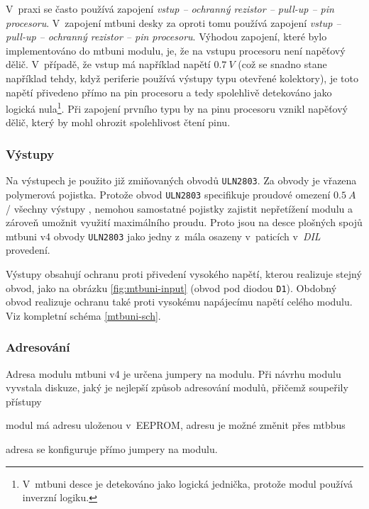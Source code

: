 V~praxi se často používá zapojení \textit{vstup – ochranný rezistor – pull-up –
pin procesoru}. V~zapojení \gls{mtbuni} desky za oproti tomu používá zapojení
\textit{vstup – pull-up – ochranný rezistor – pin procesoru}. Výhodou zapojení,
které bylo implementováno do \gls{mtbuni} modulu, je, že na vstupu procesoru
není napěťový dělič. V~případě, že vstup má například napětí $0.7~V$ (což se
snadno stane například tehdy, když periferie používá výstupy typu otevřené
kolektory), je toto napětí přivedeno přímo na pin procesoru a tedy spolehlivě
detekováno jako logická nula\footnote{V~\gls{mtbuni} desce je detekováno
jako logická jednička, protože modul používá inverzní logiku.}. Při zapojení
prvního typu by na pinu procesoru vznikl napěťový dělič, který by mohl ohrozit
spolehlivost čtení pinu.

\subsubsection{Výstupy}

Na výstupech je použito již zmiňovaných obvodů \texttt{ULN2803}. Za obvody
je vřazena polymerová pojistka. Protože obvod \texttt{ULN2803} specifikuje
proudové omezení $0.5~A$ / všechny výstupy \cite{uln2803-datasheet}, nemohou
samostatné pojistky zajistit nepřetížení modulu a zároveň umožnit využití
maximálního proudu. Proto jsou na desce plošných spojů \gls{mtbuni} v4 obvody
\texttt{ULN2803} jako jedny z~mála osazeny v~paticích v~\textit{DIL} provedení.

Výstupy obsahují ochranu proti přivedení vysokého napětí, kterou realizuje
stejný obvod, jako na obrázku \ref{fig:mtbuni-input} (obvod pod diodou
\texttt{D1}). Obdobný obvod realizuje ochranu také proti vysokému napájecímu
napětí celého modulu. Viz kompletní schéma \ref{mtbuni-sch}.

\subsubsection{Adresování}

Adresa modulu \gls{mtbuni} v4 je určena jumpery na modulu. Při návrhu modulu
vyvstala diskuze, jaký je nejlepší způsob adresování modulů, přičemž soupeřily
přístupy

\begin{compactenum}
\item modul má adresu uloženou v~EEPROM, adresu je možné změnit přes \gls{mtbbus}
\item adresa se konfiguruje přímo jumpery na modulu.
\end{compactenum}

